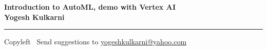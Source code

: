 
\graphicspath{{images/}}

\footnotesize


\begin{center}
\Large{\textbf{Introduction to AutoML, demo with Vertex AI\\ Yogesh Kulkarni}}  
\end{center}

\begin{multicols}{2}

\end{multicols}

\rule{\linewidth}{0.25pt}
\scriptsize
Copyleft \textcopyleft\  Send suggestions to 
\href{http://www.yogeshkulkarni.com}{yogeshkulkarni@yahoo.com}


